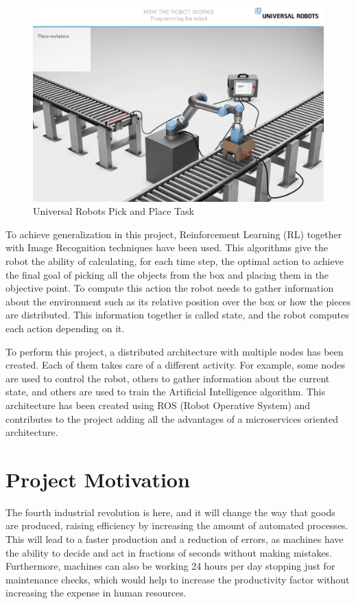 \begin{figure}
	\centering
	\includegraphics[width=0.85\linewidth]{Images/UR_conveyor}
	\caption[Pick and Place Task]{Universal Robots Pick and Place Task}
	\label{fig:urconveyor}
\end{figure}

To achieve generalization in this project, Reinforcement Learning (RL) together with Image Recognition techniques have been used. This algorithms give the robot the ability of calculating, for each time step, the optimal action to achieve the final goal of picking all the objects from the box and placing them in the objective point. To compute this action the robot needs to gather information about the environment such as its relative position over the box or how the pieces are distributed. This information together is called state, and the robot computes each action depending on it.

To perform this project, a distributed architecture with multiple nodes has been created. Each of them takes care of a different activity. For example, some nodes are used to control the robot, others to gather information about the current state, and others are used to train the Artificial Intelligence algorithm. This architecture has been created using ROS (Robot Operative System) and contributes to the project adding all the advantages of a microservices oriented architecture.

\section{Project Motivation}

The fourth industrial revolution is here, and it will change the way that goods are produced, raising efficiency by increasing the amount of automated processes. 
This will lead to a faster production and a reduction of errors, as machines have the ability to decide and act in fractions of seconds without making mistakes. Furthermore, machines can also be working 24 hours per day stopping just for maintenance checks, which would help to increase the productivity factor without increasing the expense in human resources.

